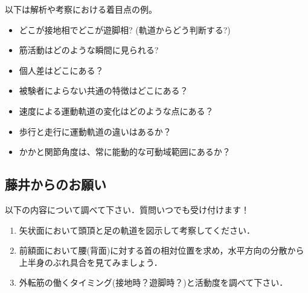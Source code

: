 \documentclass{jarticle}
\begin{document}
以下は解析や考察における着目点の例。
\begin{itemize}
\item どこが接地相でどこが遊脚相? (軌道からどう判断する?)
\item 筋活動はどのような瞬間に見られる?
\item 個人差はどこにある？
\item 被験者によらない共通の特徴はどこにある？
\item 速度による運動軌道の変化はどのような点にある？
\item 歩行と走行に運動軌道の違いはあるか？
\item かかと関節角度は、常に能動的な可動域範囲にあるか？
\end{itemize}



\subsection{藤井からのお願い}
以下の内容について調べて下さい．質問いつでも受け付けます！
\begin{enumerate}
\item 矢状面において頭頂と足の軌道を図示して考察してください．
\item 前額面において腰(背面)に対する首の相対位置を求め，水平方向の分散から上半身のぶれ具合を見てみましょう．
\item 外転筋の働くタイミング(接地時？遊脚時？)と活動度を調べて下さい．
\end{enumerate}
\end{document}
